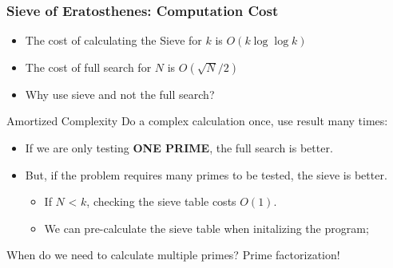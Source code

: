 \begin{frame}
  \frametitle{Sieve of Eratosthenes: Computation Cost}

    \begin{itemize}
      \item The cost of calculating the Sieve for $k$ is $O(k\log\log k)$
      \item The cost of full search for $N$ is $O(\sqrt{N}/2)$
      \item Why use sieve and not the full search?
    \end{itemize}

    \begin{block}{Amortized Complexity}
      Do a complex calculation once, use result many times:
      \begin{itemize}
      \item If we are only testing {\bf ONE PRIME}, the full search is better.
      \item But, if the problem requires many primes to be tested, the sieve is better.
        \begin{itemize}
        \item If $N$ < $k$, checking the sieve table costs $O(1)$.
        \item We can pre-calculate the sieve table when initalizing the program;
        \end{itemize}
      \end{itemize}
    \end{block}\bigskip

    When do we need to calculate multiple primes? Prime factorization!
\end{frame}

